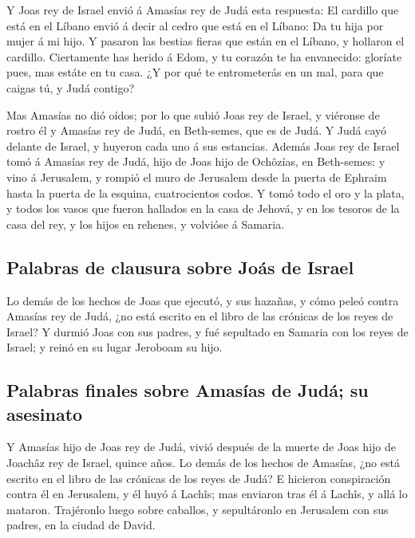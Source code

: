 Y Joas rey de Israel envió á Amasías rey de Judá esta
respuesta: El cardillo que está en el Líbano envió á decir al cedro que
está en el Líbano: Da tu hija por mujer á mi hijo. Y pasaron las bestias
fieras que están en el Líbano, y hollaron el cardillo. 
Ciertamente has herido á Edom, y tu corazón te ha envanecido: gloríate
pues, mas estáte en tu casa. ¿Y por qué te entrometerás en un mal, para
que caigas tú, y Judá contigo?

 Mas Amasías no dió oídos; por lo que subió Joas rey de
Israel, y viéronse de rostro él y Amasías rey de Judá, en Beth-semes,
que es de Judá.  Y Judá cayó delante de Israel, y huyeron
cada uno á sus estancias.  Además Joas rey de Israel tomó
á Amasías rey de Judá, hijo de Joas hijo de Ochôzías, en Beth-semes: y
vino á Jerusalem, y rompió el muro de Jerusalem desde la puerta de
Ephraim hasta la puerta de la esquina, cuatrocientos codos.
 Y tomó todo el oro y la plata, y todos los vasos que
fueron hallados en la casa de Jehová, y en los tesoros de la casa del
rey, y los hijos en rehenes, y volvióse á Samaria.

\hypertarget{palabras-de-clausura-sobre-jouxe1s-de-israel}{%
\subsection{Palabras de clausura sobre Joás de
Israel}\label{palabras-de-clausura-sobre-jouxe1s-de-israel}}

 Lo demás de los hechos de Joas que ejecutó, y sus
hazañas, y cómo peleó contra Amasías rey de Judá, ¿no está escrito en el
libro de las crónicas de los reyes de Israel?  Y durmió
Joas con sus padres, y fué sepultado en Samaria con los reyes de Israel;
y reinó en su lugar Jeroboam su hijo.

\hypertarget{palabras-finales-sobre-amasuxedas-de-juduxe1-su-asesinato}{%
\subsection{Palabras finales sobre Amasías de Judá; su
asesinato}\label{palabras-finales-sobre-amasuxedas-de-juduxe1-su-asesinato}}

 Y Amasías hijo de Joas rey de Judá, vivió después de la
muerte de Joas hijo de Joachâz rey de Israel, quince años.
 Lo demás de los hechos de Amasías, ¿no está escrito en
el libro de las crónicas de los reyes de Judá?  E
hicieron conspiración contra él en Jerusalem, y él huyó á Lachîs; mas
enviaron tras él á Lachîs, y allá lo mataron.  Trajéronlo
luego sobre caballos, y sepultáronlo en Jerusalem con sus padres, en la
ciudad de David.

